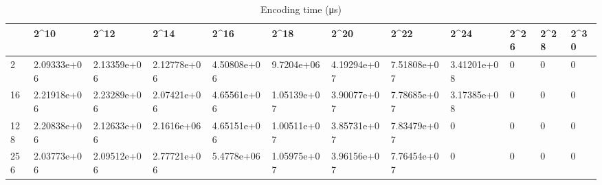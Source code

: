 \begin{table}
\caption{Encoding time (μs)}
\label{tab:encoding_time}
\begin{tabular}{llllllllllll}
\toprule
 & 2^{10} & 2^{12} & 2^{14} & 2^{16} & 2^{18} & 2^{20} & 2^{22} & 2^{24} & 2^{26} & 2^{28} & 2^{30} \\
\midrule
2 & 2.09333e+06 & 2.13359e+06 & 2.12778e+06 & 4.50808e+06 & 9.7204e+06 & 4.19294e+07 & 7.51808e+07 & 3.41201e+08 & 0 & 0 & 0 \\
16 & 2.21918e+06 & 2.23289e+06 & 2.07421e+06 & 4.65561e+06 & 1.05139e+07 & 3.90077e+07 & 7.78685e+07 & 3.17385e+08 & 0 & 0 & 0 \\
128 & 2.20838e+06 & 2.12633e+06 & 2.1616e+06 & 4.65151e+06 & 1.00511e+07 & 3.85731e+07 & 7.83479e+07 & 0 & 0 & 0 & 0 \\
256 & 2.03773e+06 & 2.09512e+06 & 2.77721e+06 & 5.4778e+06 & 1.05975e+07 & 3.96156e+07 & 7.76454e+07 & 0 & 0 & 0 & 0 \\
\bottomrule
\end{tabular}
\end{table}
